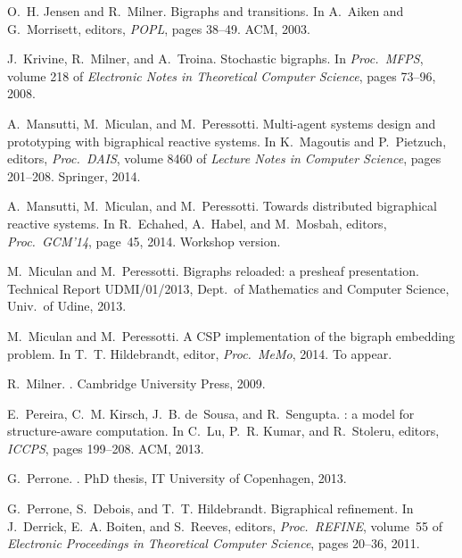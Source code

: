 \documentclass[a4paper,english,10pt]{article}
\theoremstyle{plain}\newtheorem{theorem}{Theorem}
\theoremstyle{plain}\newtheorem{corollary}[theorem]{Corollary}
\theoremstyle{plain}\newtheorem{proposition}[theorem]{Proposition}
\theoremstyle{plain}\newtheorem{lemma}[theorem]{Lemma}
\theoremstyle{plain}\newtheorem{definition}{Definition}
\theoremstyle{plain}\newtheorem{remark}{Remark}
\theoremstyle{plain}\newtheorem{example}[remark]{Example}
\newcommand{\?}[1]{}
\begin{document}
{\begin{thebibliography}{10}
O.~H. Jensen and R.~Milner.
\newblock Bigraphs and transitions.
\newblock In A.~Aiken and G.~Morrisett, editors, {\em POPL}, pages 38--49. ACM,
  2003.

J.~Krivine, R.~Milner, and A.~Troina.
\newblock Stochastic bigraphs.
\newblock In {\em Proc.~MFPS}, volume 218 of {\em Electronic Notes in
  Theoretical Computer Science}, pages 73--96, 2008.

A.~Mansutti, M.~Miculan, and M.~Peressotti.
\newblock Multi-agent systems design and prototyping with bigraphical reactive
  systems.
\newblock In K.~Magoutis and P.~Pietzuch, editors, {\em Proc.~DAIS}, volume
  8460 of {\em Lecture Notes in Computer Science}, pages 201--208. Springer,
  2014.

A.~Mansutti, M.~Miculan, and M.~Peressotti.
\newblock Towards distributed bigraphical reactive systems.
\newblock In R.~Echahed, A.~Habel, and M.~Mosbah, editors, {\em Proc.~GCM'14},
  page~45, 2014.
\newblock Workshop version.

M.~Miculan and M.~Peressotti.
\newblock Bigraphs reloaded: a presheaf presentation.
\newblock Technical Report UDMI/01/2013, Dept.~of Mathematics and Computer
  Science, Univ.~of Udine, 2013.

M.~Miculan and M.~Peressotti.
\newblock A {CSP} implementation of the bigraph embedding problem.
\newblock In T.~T. Hildebrandt, editor, {\em Proc.~MeMo}, 2014.
\newblock To appear.

R.~Milner.
.
\newblock Cambridge University Press, 2009.

E.~Pereira, C.~M. Kirsch, J.~B. de~Sousa, and R.~Sengupta.
: a model for structure-aware computation.
\newblock In C.~Lu, P.~R. Kumar, and R.~Stoleru, editors, {\em ICCPS}, pages
  199--208. ACM, 2013.

G.~Perrone.
.
\newblock PhD thesis, IT University of Copenhagen, 2013.

G.~Perrone, S.~Debois, and T.~T. Hildebrandt.
\newblock Bigraphical refinement.
\newblock In J.~Derrick, E.~A. Boiten, and S.~Reeves, editors, {\em
  Proc.~REFINE}, volume~55 of {\em Electronic Proceedings in Theoretical
  Computer Science}, pages 20--36, 2011.


\end{thebibliography}}
\end{document}
